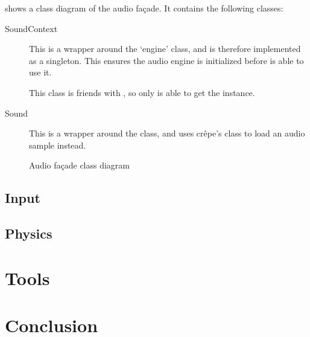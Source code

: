 \documentclass{projdoc}
\begin{document}
 shows a class diagram of the audio fa\c{c}ade. It
contains the following classes:
\begin{description}
	\item[SoundContext] This is a wrapper around the 
		`engine' class, and is therefore implemented as a singleton. This ensures the
		audio engine is initialized before  is able to use it.

		This class is friends with , so only  is able
		to get the  instance.
	\item[Sound] This is a wrapper around the  class, and uses
		cr\^epe's  class to load an audio sample instead.
\end{description}

\begin{figure}
	\centering
	\caption{Audio fa\c{c}ade class diagram}
	\label{fig:class-audio-facade}
\end{figure}

\subsection{Input}

\subsection{Physics}

\section{Tools}

\section{Conclusion}
\end{document}

